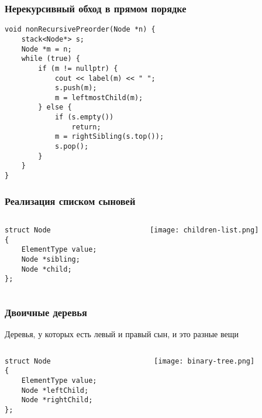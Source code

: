 \documentclass[xetex,mathserif,serif]{beamer}
\begin{document}
	\begin{frame}[fragile]
		\frametitle{Нерекурсивный обход в прямом порядке}
		\begin{footnotesize}
			\begin{verbatim}
void nonRecursivePreorder(Node *n) {
    stack<Node*> s;
    Node *m = n;
    while (true) {
        if (m != nullptr) {
            cout << label(m) << " ";
            s.push(m);
            m = leftmostChild(m);
        } else {
            if (s.empty())
                return;
            m = rightSibling(s.top());
            s.pop();
        }
    }
}
			\end{verbatim}
		\end{footnotesize}
	\end{frame}

	\begin{frame}[fragile]
		\frametitle{Реализация списком сыновей}
		\begin{columns}
			\begin{column}{0.3\textwidth}
				\begin{footnotesize}
					\begin{verbatim}
struct Node
{
    ElementType value;
    Node *sibling;
    Node *child;
};
					\end{verbatim}
				\end{footnotesize}
			\end{column}
			\begin{column}{0.7\textwidth}
				\begin{center}
					\texttt{[image: children-list.png]}
				\end{center}
			\end{column}
		\end{columns}
	\end{frame}

	\begin{frame}[fragile]
		\frametitle{Двоичные деревья}
		Деревья, у которых есть левый и правый сын, и это разные вещи
		\begin{columns}
			\begin{column}{0.4\textwidth}
				\begin{footnotesize}
					\begin{verbatim}
struct Node
{
    ElementType value;
    Node *leftChild;
    Node *rightChild;
};
					\end{verbatim}
				\end{footnotesize}
			\end{column}
			\begin{column}{0.5\textwidth}
				\begin{center}
					\texttt{[image: binary-tree.png]}
				\end{center}
			\end{column}
		\end{columns}
	\end{frame}
\end{document}
